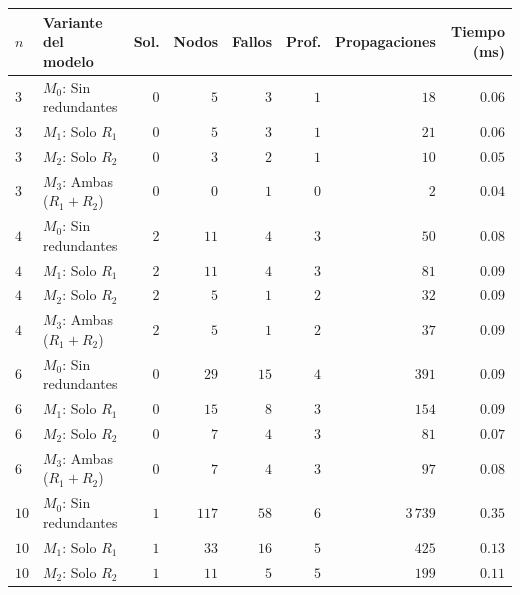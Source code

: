 \begin{table}[htbp]
    \centering
    \small
    \setlength{\tabcolsep}{4.5pt}
    \begin{tabular}{llrrrrrr}
        \toprule
        $n$ & Variante del modelo & Sol. & Nodos & Fallos & Prof. & Propagaciones & Tiempo (ms) \\
        \midrule
        $3$   & $M_0$: Sin redundantes          & $0$ & $5$       & $3$      & $1$  & $18$          & $0.06$ \\
        $3$   & $M_1$: Solo $R_1$               & $0$ & $5$       & $3$      & $1$  & $21$          & $0.06$ \\
        $3$   & $M_2$: Solo $R_2$               & $0$ & $3$       & $2$      & $1$  & $10$          & $0.05$ \\
        $3$   & $M_3$: Ambas ($R_1 + R_2$)      & $0$ & $0$       & $1$      & $0$  & $2$           & $0.04$ \\
        \midrule
        $4$   & $M_0$: Sin redundantes          & $2$ & $11$      & $4$      & $3$  & $50$          & $0.08$ \\
        $4$   & $M_1$: Solo $R_1$               & $2$ & $11$      & $4$      & $3$  & $81$          & $0.09$ \\
        $4$   & $M_2$: Solo $R_2$               & $2$ & $5$       & $1$      & $2$  & $32$          & $0.09$ \\
        $4$   & $M_3$: Ambas ($R_1 + R_2$)      & $2$ & $5$       & $1$      & $2$  & $37$          & $0.09$ \\
        \midrule
        $6$   & $M_0$: Sin redundantes          & $0$ & $29$      & $15$     & $4$  & $391$         & $0.09$ \\
        $6$   & $M_1$: Solo $R_1$               & $0$ & $15$      & $8$      & $3$  & $154$         & $0.09$ \\
        $6$   & $M_2$: Solo $R_2$               & $0$ & $7$       & $4$      & $3$  & $81$          & $0.07$ \\
        $6$   & $M_3$: Ambas ($R_1 + R_2$)      & $0$ & $7$       & $4$      & $3$  & $97$          & $0.08$ \\
        \midrule
        $10$  & $M_0$: Sin redundantes          & $1$ & $117$     & $58$     & $6$  & $3\,739$      & $0.35$ \\
        $10$  & $M_1$: Solo $R_1$               & $1$ & $33$      & $16$     & $5$  & $425$         & $0.13$ \\
        $10$  & $M_2$: Solo $R_2$               & $1$ & $11$      & $5$      & $5$  & $199$         & $0.11$ \\

\end{tabular}
\end{table}
